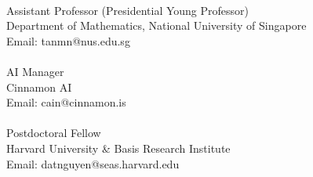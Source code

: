\\
Assistant Professor (Presidential Young Professor)\\
Department of Mathematics, National University of Singapore\\
Email: tanmn@nus.edu.sg\\


\\
AI Manager\\
Cinnamon AI\\
Email: cain@cinnamon.is\\

\\
Postdoctoral Fellow\\
Harvard University \& Basis Research Institute\\
Email: datnguyen@seas.harvard.edu\\